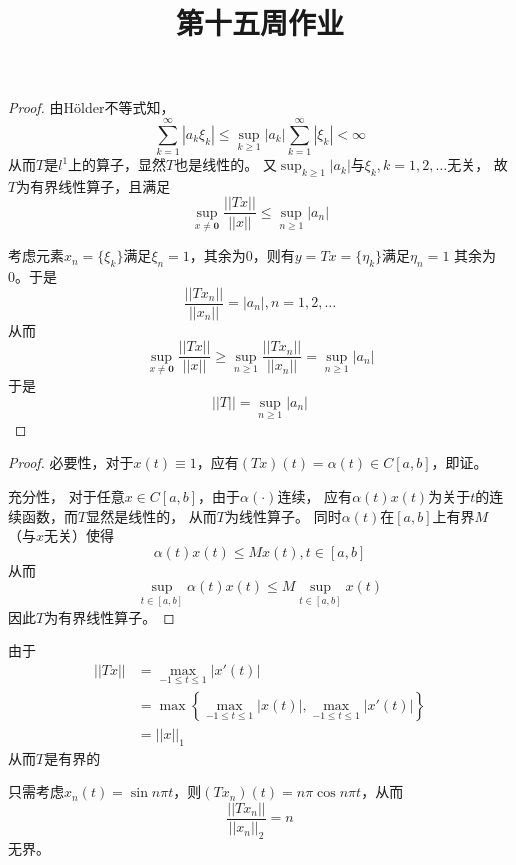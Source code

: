 \documentclass[cn]{homework}
\title{第十五周作业}
\begin{document}
    \maketitle

    \problem
    \begin{proof}
        由H\"older不等式知，
        \[\sum_{k=1}^\infty |a_k\xi_k|
        \leq\sup_{k\geq 1}|a_k|\sum_{k=1}^\infty|\xi_k|<\infty\]
        从而$T$是$l^1$上的算子，显然$T$也是线性的。
        又$\sup_{k\geq 1}|a_k|$与$\xi_k,k=1,2,\ldots$无关，
        故$T$为有界线性算子，且满足
        \[\sup_{x\neq\boldsymbol 0}\frac{||Tx||}{||x||}\leq\sup_{n\geq 1}|a_n|\]

        考虑元素$x_n=\{\xi_k\}$满足$\xi_n=1$，其余为0，则有$y=Tx=\{\eta_k\}$满足$\eta_n=1$
        其余为0。于是
        \[\frac{||Tx_n||}{||x_n||}=|a_n|,n=1,2,\ldots\]
        从而
        \[\sup_{x\neq\boldsymbol 0}\frac{||Tx||}{||x||}
        \geq\sup_{n\geq 1}\frac{||Tx_n||}{||x_n||}
        =\sup_{n\geq 1}|a_n|\]
        于是
        \[||T||=\sup_{n\geq 1}|a_n|\]
    \end{proof}

    \problem
    \begin{proof}
        必要性，对于$x(t)\equiv 1$，应有$(Tx)(t)=\alpha(t)\in C[a,b]$，即证。
        
        充分性，
        对于任意$x\in C[a,b]$，由于$\alpha(\cdot)$连续，
        应有$\alpha(t)x(t)$为关于$t$的连续函数，而$T$显然是线性的，
        从而$T$为线性算子。
        同时$\alpha(t)$在$[a,b]$上有界$M$（与$x$无关）使得
        \[\alpha(t)x(t)\leq Mx(t),t\in[a,b]\]
        从而
        \[\sup_{t\in[a,b]}\alpha(t)x(t)\leq M\sup_{t\in[a,b]}x(t)\]
        因此$T$为有界线性算子。
    \end{proof}

    \problem
    \begin{subproblem}[(\arabic*)]
        \item
        由于
        \[\begin{aligned}
            ||Tx||&=\max_{-1\leq t\leq 1}|x'(t)|\\
            &=\max\left\{\max_{-1\leq t\leq 1}|x(t)|,\max_{-1\leq t\leq 1}|x'(t)|\right\}\\
            &=||x||_1
        \end{aligned}\]
        从而$T$是有界的
        
        \item
        只需考虑$x_n(t)=\sin n\pi t$，则$(Tx_n)(t)=n\pi\cos n\pi t$，从而
        \[\frac{||Tx_n||}{||x_n||_2}=n\]
        无界。

    \end{subproblem}
\end{document}
